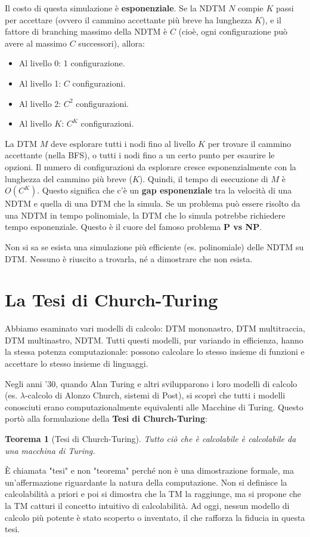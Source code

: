 \documentclass[a4paper]{article}
\newtheorem{theorem}{Teorema}
\begin{document}
Il costo di questa simulazione è \textbf{esponenziale}. Se la NDTM $N$ compie $K$ passi per accettare (ovvero il cammino accettante più breve ha lunghezza $K$), e il fattore di branching massimo della NDTM è $C$ (cioè, ogni configurazione può avere al massimo $C$ successori), allora:
\begin{itemize}
    \item Al livello 0: 1 configurazione.
    \item Al livello 1: $C$ configurazioni.
    \item Al livello 2: $C^2$ configurazioni.
    \item Al livello $K$: $C^K$ configurazioni.
\end{itemize}
La DTM $M$ deve esplorare tutti i nodi fino al livello $K$ per trovare il cammino accettante (nella BFS), o tutti i nodi fino a un certo punto per esaurire le opzioni. Il numero di configurazioni da esplorare cresce esponenzialmente con la lunghezza del cammino più breve ($K$). Quindi, il tempo di esecuzione di $M$ è $O(C^K)$.
Questo significa che c'è un \textbf{gap esponenziale} tra la velocità di una NDTM e quella di una DTM che la simula. Se un problema può essere risolto da una NDTM in tempo polinomiale, la DTM che lo simula potrebbe richiedere tempo esponenziale. Questo è il cuore del famoso problema \textbf{P vs NP}.

Non si sa se esista una simulazione più efficiente (es. polinomiale) delle NDTM su DTM. Nessuno è riuscito a trovarla, né a dimostrare che non esista.

\section{La Tesi di Church-Turing}

Abbiamo esaminato vari modelli di calcolo: DTM mononastro, DTM multitraccia, DTM multinastro, NDTM. Tutti questi modelli, pur variando in efficienza, hanno la stessa potenza computazionale: possono calcolare lo stesso insieme di funzioni e accettare lo stesso insieme di linguaggi.

Negli anni '30, quando Alan Turing e altri svilupparono i loro modelli di calcolo (es. $\lambda$-calcolo di Alonzo Church, sistemi di Post), si scoprì che tutti i modelli conosciuti erano computazionalmente equivalenti alle Macchine di Turing. Questo portò alla formulazione della \textbf{Tesi di Church-Turing}:

\begin{theorem}[Tesi di Church-Turing]
\emph{Tutto ciò che è calcolabile è calcolabile da una macchina di Turing.}
\end{theorem}
È chiamata "tesi" e non "teorema" perché non è una dimostrazione formale, ma un'affermazione riguardante la natura della computazione. Non si definisce la calcolabilità a priori e poi si dimostra che la TM la raggiunge, ma si propone che la TM catturi il concetto intuitivo di calcolabilità. Ad oggi, nessun modello di calcolo più potente è stato scoperto o inventato, il che rafforza la fiducia in questa tesi.
\end{document}

